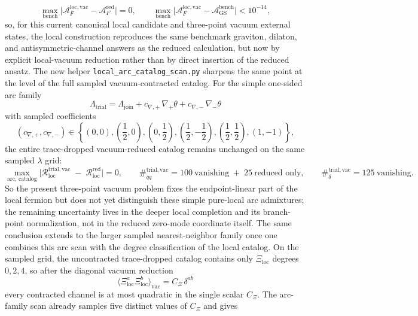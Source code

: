 \documentclass[11pt]{article}
\begin{document}
\begin{equation}
\max_{\mathrm{bench}}\bigl|\mathcal{A}^{\mathrm{loc,vac}}_F-\mathcal{A}^{\mathrm{red}}_F\bigr|=0,
\qquad
\max_{\mathrm{bench}}\bigl|\mathcal{A}^{\mathrm{loc,vac}}_F-\mathcal{A}^{\mathrm{bench}}_{\mathrm{GS}}\bigr|<10^{-14},
\label{eq:theta-local-tree-benchmark}
\end{equation}
so, for this current canonical local candidate and three-point vacuum external states, the local construction reproduces the same benchmark graviton, dilaton, and antisymmetric-channel answers as the reduced calculation, but now by explicit local-vacuum reduction rather than by direct insertion of the reduced ansatz.
The new helper \texttt{local\_arc\_catalog\_scan.py} sharpens the same point at
the level of the full sampled vacuum-contracted catalog. For the simple
one-sided arc family
\[
\Lambda_{\mathrm{trial}}
=
\Lambda_{\mathrm{join}}
+c_{\nabla,+}\,\nabla_+\theta
+c_{\nabla,-}\,\nabla_-\theta
\]
with sampled coefficients
\[
(c_{\nabla,+},c_{\nabla,-})
\in
\left\{
(0,0),\left(\frac12,0\right),\left(0,\frac12\right),
\left(\frac12,-\frac12\right),\left(\frac12,\frac12\right),(1,-1)
\right\},
\]
the entire trace-dropped vacuum-reduced catalog remains unchanged on the same
sampled $\lambda$ grid:
\begin{equation}
\max_{\mathrm{arc},\,\mathrm{catalog}}
\bigl|
\mathcal{R}^{\mathrm{trial,vac}}_{\mathrm{loc}}
\;-\;
\mathcal{R}^{\mathrm{red}}_{\mathrm{loc}}
\bigr|
=0,
\qquad
\#_{qq}^{\mathrm{trial,vac}}
=
100\ \text{vanishing}
\;+\;
25\ \text{reduced only},
\qquad
\#_{\delta}^{\mathrm{trial,vac}}
=
125\ \text{vanishing}.
\label{eq:theta-local-arc-catalog}
\end{equation}
So the present three-point vacuum problem fixes the endpoint-linear part of the
local fermion but does not yet distinguish these simple pure-local arc
admixtures; the remaining uncertainty lives in the deeper local completion and
its branch-point normalization, not in the reduced zero-mode coordinate itself.
The same conclusion extends to the larger sampled nearest-neighbor family once
one combines this arc scan with the degree classification of the local catalog.
On the sampled grid, the uncontracted trace-dropped catalog contains only
$\Xi_{\mathrm{loc}}$ degrees $0,2,4$, so after the diagonal vacuum reduction
\[
\langle \Xi_{\mathrm{loc}}^a \Xi_{\mathrm{loc}}^b\rangle_{\mathrm{vac}}
=
C_\Xi\,\delta^{ab}
\]
every contracted channel is at most quadratic in the single scalar $C_\Xi$.
The arc-family scan already samples five distinct values of $C_\Xi$ and gives
\end{document}

